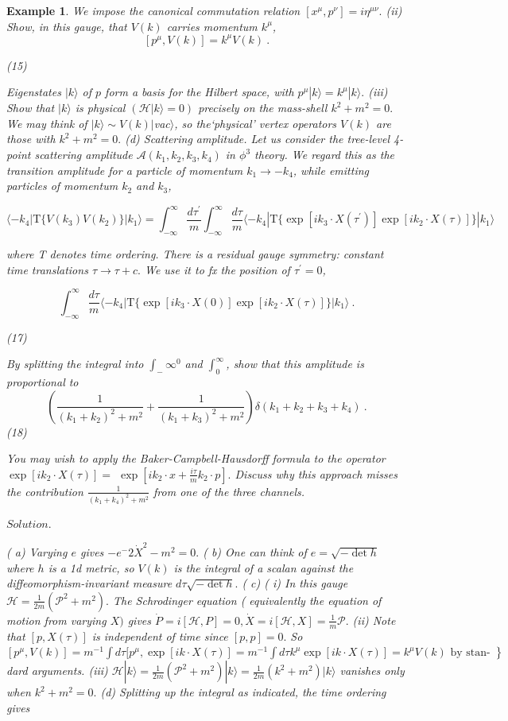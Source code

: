 \documentclass[10pt,
 article,
 amsmath,amssymb
]{revtex4-2}
\newtheorem{example}[theorem]{Example}
\begin{document}
\begin{example}
We impose the canonical commutation relation $[x^\mu,p^\nu]=i\eta^{\mu\nu}.$
(ii) Show, in this gauge, that $V(k)$ carries momentum $k^\mu$,
$$[p^\mu,V(k)]=k^\mu V(k)\:.$$

(15)

Eigenstates $|k\rangle$ of $p$ form a basis for the Hilbert space, with $p^\mu|k\rangle=k^\mu|k\rangle.$
(iii) Show that $|k\rangle$ is physical $(\mathcal{H}|k\rangle=0)$ precisely on the mass-shell $k^2+m^2=0.$
We may think of $|k\rangle\sim V(k)|$vac$\rangle$, so the‘physical’ vertex operators $V(k)$ are those with
$k^2+m^2=0.$
(d) Scattering amplitude. Let us consider the tree-level 4-point scattering amplitude $\mathcal{A}(k_1,k_2,k_3,k_4)$
in $\phi ^3$ theory. We regard this as the transition amplitude for a particle of momentum
$k_1\to-k_4$, while emitting particles of momentum $k_2$ and $k_3$,


$$\langle-k_4|\mathrm{T}\big\{V(k_3)V(k_2)\big\}|k_1\rangle=\int_{-\infty}^\infty\frac{d\tau^{\prime}}m\int_{-\infty}^\infty\frac{d\tau}m\langle-k_4|\mathrm{T}\big\{\exp\left[ik_3\cdot X(\tau^{\prime})\right]\exp\left[ik_2\cdot X(\tau)\right]\big\}|k_1\rangle $$


where T denotes time ordering.
There is a residual gauge symmetry: constant time translations $\tau\to\tau+c.$ We use it to fx
the position of $\tau^\prime=0$,

$$\int_{-\infty}^\infty\frac{d\tau}m\langle-k_4|\mathrm{T}\big\{\exp\left[ik_3\cdot X(0)\right]\exp\left[ik_2\cdot X(\tau)\right]\big\}|k_1\rangle\:.$$

(17)

By splitting the integral into $\int_-\infty^0$ and $\int_0^\infty$, show that this amplitude is proportional to
$$\left(\frac1{(k_1+k_2)^2+m^2}+\frac1{(k_1+k_3)^2+m^2}\right)\delta(k_1+k_2+k_3+k_4)\:.$$
(18)


You may wish to apply the Baker-Campbell-Hausdorff formula to the operator $\exp\left[ik_2\cdot X(\tau)\right]=$
$\exp\left[ik_2\cdot x+\frac{i\tau}mk_2\cdot p\right].$
Discuss why this approach misses the contribution $\frac1{(k_1+k_4)^2+m^2}$ from one of the three channels.

$\textit{Solution. }$

( a) Varying $e$ gives $-e^-2\dot{X}^2-m^2=0.$
( b) One can think of $e= \sqrt {- \det h}$ where $h$ is a 1d metric, so $V(k)$ is the integral of a scalan
against the diffeomorphism-invariant measure $d\tau\sqrt{-\det h}.$
( c) ( i) In this gauge $\mathcal{H} = \frac 1{2m}( \mathcal{P} ^2+ m^2) .$ The Schrodinger equation ( equivalently the equation
of motion from varying $X)$ gives $\dot{P}=i[\mathcal{H},P]=0,\dot{X}=i[\mathcal{H},X]=\frac1m\mathcal{P}.$
(ii) Note that $[p,X(\tau)]$ is independent of time since $[p,p]=0.$
So $[p^\mu,V(k)]=m^{-1}\int d\tau[p^\mu,\exp\left[ik\cdot X(\tau)\right]=m^{-1}\int d\tau\left.k^\mu\exp\left[ik\cdot X(\tau)\right]=k^\mu V(k)\text{ by stan- }\right\}$
dard arguments.
(iii) $\mathcal{H}|k\rangle=\frac1{2m}(\mathcal{P}^2+m^2)|k\rangle=\frac1{2m}(k^2+m^2)|k\rangle$ vanishes only when $k^2+m^2=0.$
(d) Splitting up the integral as indicated, the time ordering gives


\end{example}
\end{document}
